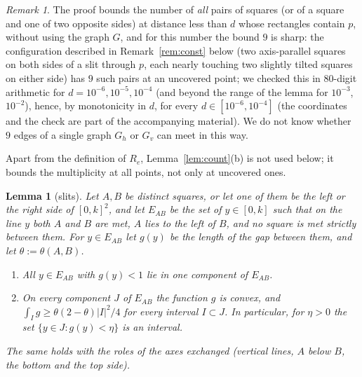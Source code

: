 \documentclass[11pt]{amsart}
\newtheorem{lemma}[theorem]{Lemma}
\theoremstyle{definition}
\theoremstyle{remark}
\newtheorem{remark}[theorem]{Remark}
\begin{document}
\begin{remark}
The proof bounds the number of \emph{all} pairs of squares (or of a square and one of two opposite sides) at distance less than $d$ whose
rectangles contain $p$, without using the graph $G$, and for this number the bound $9$ is sharp: the configuration described in
Remark~\ref{rem:const} below (two axis-parallel squares on both sides of a slit through $p$, each nearly touching two slightly
tilted squares on either side) has $9$ such pairs at an uncovered point; we checked this in $80$-digit arithmetic for
$d=10^{-6},10^{-5},10^{-4}$ (and beyond the range of the lemma for $10^{-3}$, $10^{-2}$), hence, by monotonicity in $d$,
for every $d\in[10^{-6},10^{-4}]$ (the coordinates and the check are part of the accompanying material). We do not know whether $9$ edges of a single graph $G_h$ or $G_v$ can meet in this way.
\end{remark}

Apart from the definition of $R_e$, Lemma~\ref{lem:count}(b) is not used below; it bounds the multiplicity at all points,
not only at uncovered ones.

\begin{lemma}[slits]\label{lem:slit}
Let $A,B$ be distinct squares, or let one of them be the left or the right side of $[0,k]^2$, and let $E_{AB}$ be the set
of $y\in[0,k]$ such that on the line $y$ both $A$ and $B$ are met, $A$ lies to the left of $B$, and no square is met
strictly between them. For $y\in E_{AB}$ let $g(y)$ be the length of the gap between them, and let $\theta:=\theta(A,B)$.
\begin{enumerate}[label=(\alph*)]
\item All $y\in E_{AB}$ with $g(y)<1$ lie in one component of $E_{AB}$.
\item On every component $J$ of $E_{AB}$ the function $g$ is convex, and $\int_Ig\ge\theta(2-\theta)|I|^2/4$ for every interval
$I\subset J$. In particular, for $\eta>0$ the set $\{y\in J:g(y)<\eta\}$ is an interval.
\end{enumerate}
The same holds with the roles of the axes exchanged (vertical lines, $A$ below $B$, the bottom and the top side).
\end{lemma}
\end{document}
